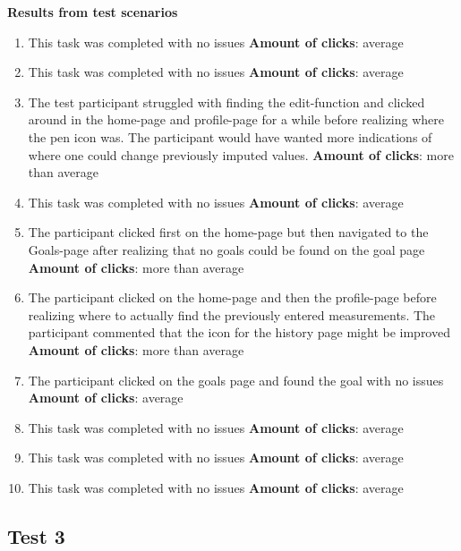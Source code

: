 \noindent\textbf{Results from test scenarios}
\begin{enumerate}
\item This task was completed with no issues
\subitem \textbf{Amount of clicks}: average
\item This task was completed with no issues
\subitem \textbf{Amount of clicks}: average
\item The test participant struggled with finding the edit-function and clicked around in the home-page and profile-page for a while before realizing where the pen icon was. The participant would have wanted more indications of where one could change previously imputed values. 
\subitem \textbf{Amount of clicks}: more than average
\item This task was completed with no issues
\subitem \textbf{Amount of clicks}: average
\item The participant clicked first on the home-page but then navigated to the Goals-page after realizing that no goals could be found on the goal page
\subitem \textbf{Amount of clicks}: more than average
\item The participant clicked on the home-page and then the profile-page before realizing where to actually find the previously entered measurements. The participant commented that the icon for the history page might be improved
\subitem \textbf{Amount of clicks}: more than average
\item The participant clicked on the goals page and found the goal with no issues
\subitem \textbf{Amount of clicks}: average
\item This task was completed with no issues
\subitem \textbf{Amount of clicks}: average
\item This task was completed with no issues
\subitem \textbf{Amount of clicks}: average
\item This task was completed with no issues 
\subitem \textbf{Amount of clicks}: average
\end{enumerate}



\subsection{Test 3}

